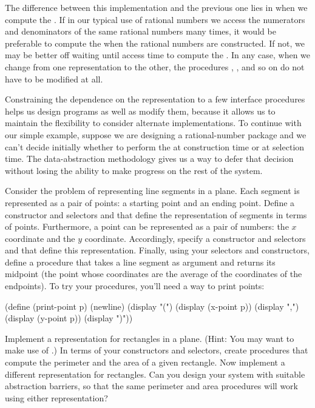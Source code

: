 \noindent
The difference between this implementation and the previous one lies in when we
compute the .  If in our typical use of rational numbers we access
the numerators and denominators of the same rational numbers many times, it
would be preferable to compute the  when the rational numbers are
constructed.  If not, we may be better off waiting until access time to compute
the .  In any case, when we change from one representation to the
other, the procedures , , and so on do not have to
be modified at all.

Constraining the dependence on the representation to a few interface procedures
helps us design programs as well as modify them, because it allows us to
maintain the flexibility to consider alternate implementations.  To continue
with our simple example, suppose we are designing a rational-number package and
we can't decide initially whether to perform the  at construction
time or at selection time.  The data-abstraction methodology gives us a way to
defer that decision without losing the ability to make progress on the rest of
the system.

\begin{exerciseGroup}
\label{Exercise 2.2}
 Consider the problem of
representing line segments in a plane.  Each segment is represented as a pair
of points: a starting point and an ending point.  Define a constructor
 and selectors  and 
that define the representation of segments in terms of points.  Furthermore, a
point can be represented as a pair of numbers: the \( x \) coordinate and the
\( y \) coordinate.  Accordingly, specify a constructor  and
selectors  and  that define this representation.
Finally, using your selectors and constructors, define a procedure
 that takes a line segment as argument and returns its
midpoint (the point whose coordinates are the average of the coordinates of the
endpoints).  To try your procedures, you'll need a way to print points:

\begin{codeBlock}
(define (print-point p)
  (newline)
  (display "(")
  (display (x-point p))
  (display ",")
  (display (y-point p))
  (display ")"))
\end{codeBlock}

\label{Exercise 2.3}
 Implement a representation for
rectangles in a plane.  (Hint: You may want to make use of .)
In terms of your constructors and selectors, create procedures that compute the
perimeter and the area of a given rectangle.  Now implement a different
representation for rectangles.  Can you design your system with suitable
abstraction barriers, so that the same perimeter and area procedures will work
using either representation?
\end{exerciseGroup}


